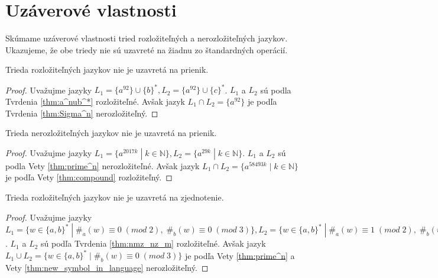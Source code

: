 \section{Uzáverové vlastnosti}

Skúmame uzáverové vlastnosti tried rozložiteľných a nerozložiteľných jazykov. Ukazujeme, že obe triedy nie sú uzavreté na žiadnu zo štandardných operácií.

\begin{proposition}
Trieda rozložiteľných jazykov nie je uzavretá na prienik.
\end{proposition}

\begin{proof}
Uvažujme jazyky $ L_1 = \lbrace a^{92} \rbrace \cup \lbrace b \rbrace^*, L_2 = \lbrace a^{92} \rbrace \cup \lbrace c \rbrace^* $. $ L_1 $ a $ L_2 $ sú podla Tvrdenia \ref{thm:a^nub^*} rozložiteľné. Avšak jazyk $ L_1 \cap L_2 = \lbrace a^{92} \rbrace $ je podľa Tvrdenia \ref{thm:Sigma^n} nerozložiteľný.
\end{proof}

\begin{proposition}
Trieda nerozložiteľných jazykov nie je uzavretá na prienik.
\end{proposition}

\begin{proof}
Uvažujme jazyky $ L_1 = \lbrace a^{2017k} \; | \; k \in \mathbb{N} \rbrace, L_2 = \lbrace a^{29k} \; | \; k \in \mathbb{N} \rbrace $. $ L_1 $ a $ L_2 $ sú podla Vety \ref{thm:prime^n} nerozložiteľné. Avšak jazyk $ L_1 \cap L_2 = \lbrace a^{58493k} \; | \; k \in \mathbb{N} \rbrace $ je podľa Vety \ref{thm:compound} rozložiteľný.
\end{proof}

\begin{proposition}
Trieda rozložiteľných jazykov nie je uzavretá na zjednotenie.
\end{proposition}

\begin{proof}
Uvažujme jazyky $ L_1 = \lbrace w \in \lbrace a,b \rbrace^* \; | \; \#_a(w) \equiv 0 \; (mod \; 2), \; \#_b(w) \equiv 0 \; (mod \; 3) \rbrace, L_2 = \lbrace w \in \lbrace a,b \rbrace^* \; | \; \#_a(w) \equiv 1 \; (mod \; 2), \; \#_b(w) \equiv 0 \; (mod \; 3) \rbrace $. $ L_1 $ a $ L_2 $ sú podľa Tvrdenia \ref{thm:nmz_nz_m} rozložiteľné. Avšak jazyk $ L_1 \cup L_2 = \lbrace w \in \lbrace a,b \rbrace^* \; | \; \#_b(w) \equiv 0 \; (mod \; 3) \rbrace $ je podľa Vety \ref{thm:prime^n} a Vety \ref{thm:new_symbol_in_language} nerozložiteľný.
\end{proof}

